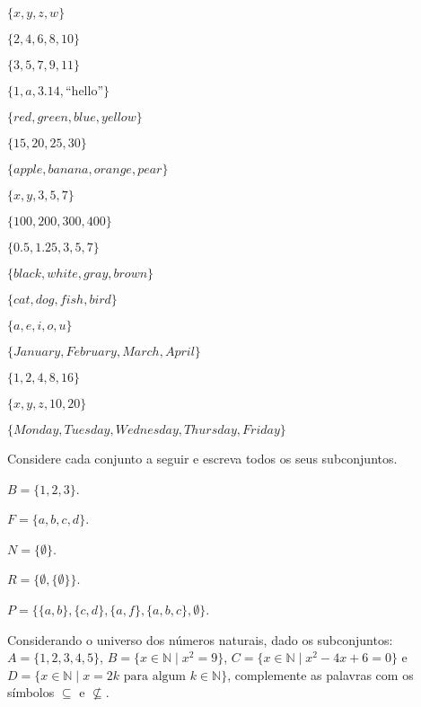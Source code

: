 \begin{exerList}
  \item $\{x, y, z, w\}$
  \item $\{2, 4, 6, 8, 10\}$
  \item $\{3, 5, 7, 9, 11\}$
  \item $\{1, a, 3.14, \text{``hello''}\}$
  \item $\{red, green, blue, yellow\}$
  \item $\{15, 20, 25, 30\}$
  \item $\{apple, banana, orange, pear\}$
  \item $\{x, y, 3, 5, 7\}$
  \item $\{100, 200, 300, 400\}$
  \item $\{0.5, 1.25, 3, 5, 7\}$
  \item $\{black, white, gray, brown\}$
  \item $\{cat, dog, fish, bird\}$
  \item $\{a, e, i, o, u\}$
  \item $\{January, February, March, April\}$
  \item $\{1, 2, 4, 8, 16\}$
  \item $\{x, y, z, 10, 20\}$
  \item $\{Monday, Tuesday, Wednesday, Thursday, Friday\}$
\end{exerList}

\begin{questao}\label{test:Conjuntos5}
	Considere cada conjunto a seguir e escreva todos os seus subconjuntos.
\end{questao}

\begin{exerList}
	\item $B = \{1, 2, 3\}$.
	\item $F = \{a, b, c, d\}$.
	\item $N = \{\emptyset\}$.
	\item $R = \{\emptyset, \{\emptyset\}\}$.
	\item $P = \{\{a, b\}, \{c, d\}, \{a, f\}, \{a, b, c\}, \emptyset\}$.
\end{exerList}

\begin{questao}\label{test:Conjuntos6}
	Considerando o universo dos números naturais, dado os subconjuntos:  $A = \{1, 2, 3, 4, 5\}$, $B = \{x \in \mathbb{N} \mid x^2 = 9\}$, $C = \{x \in \mathbb{N} \mid x^2 - 4x + 6 = 0\}$ e $D = \{x \in \mathbb{N} \mid  x = 2k \mbox{ para algum } k \in \mathbb{N}\}$, complemente as palavras com os símbolos $\subseteq$ e $\not\subseteq$.
\end{questao}

